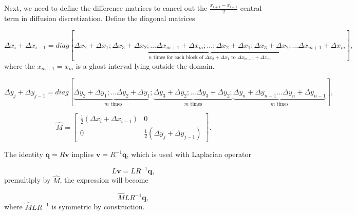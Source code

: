 \documentclass{article}
\begin{document}
Next, we need to define the difference matrices to cancel out the $\frac{x_{i+1}−x_{i-1}}{2}$ central term in diffusion discretization. Define the diagonal matrices

\begin{equation*}
{\Delta x_i+\Delta x_{i-1}} = diag[\underbrace{\Delta x_2+\Delta x_1; \Delta x_3+\Delta x_2; \dotsc \Delta x_{m+1}+\Delta x_{m}; ...;\Delta x_2+\Delta x_1; \Delta x_3+\Delta x_2; \dotsc \Delta x_{m+1}+\Delta x_{m}}_{n\text{ times for each block of } \Delta x_2+\Delta x_1\text{ to }\Delta x_{m+1}+\Delta x_{m}}],
\end{equation*}
where the $x_{m+1}=x_m$ is a ghost interval lying outside the domain. 


\begin{equation*}
{\Delta y_j+\Delta y_{j-1}} = diag[\underbrace{\Delta y_2+\Delta y_1;  \dotsc \Delta y_2+\Delta y_1;}_{m\text{ times}} \underbrace{\Delta y_3+\Delta y_2; \dotsc \Delta y_3+\Delta y_2;}_{m\text{ times}} \underbrace{\Delta y_n+\Delta y_{n-1}\dotsc \Delta y_n+\Delta y_{n-1}}_{m\text{ times}}],	
\end{equation*}


\begin{equation*}
\hat{M} =\left[\begin{array}{cc}
\frac{1}{2}\left(\Delta x_i+\Delta x_{i-1}\right) & 0 \\
0 & \frac{1}{2}\left(\Delta y_j+\Delta y_{j-1}\right)
\end{array}\right].
\end{equation*}

The identity $\boldsymbol{q}=R\boldsymbol{v}$ implies $\boldsymbol{v}=R^{-1}\boldsymbol{q}$, which is used with Laplacian operator

$$L\boldsymbol{v}= LR^{-1}\boldsymbol{q},$$ 
premultiply by $\hat M$, the expression will become 

$$\hat MLR^{-1}\boldsymbol{q},$$ 
where $\hat M L R^{-1}$ is symmetric by construction.  
\end{document}
